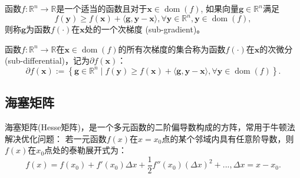 \begin{definition}[次梯度]
    函数$f: \mathbb{R}^{n} \rightarrow \mathbb{R}$是一个适当的函数且对于$\bm{x} \in \operatorname{dom}(f)$, 如果向量$\bm{g} \in \mathbb{R}^{n}$满足
    \begin{equation}
        f(\bm{y}) \geq f(\bm{x})+\langle\bm{g}, \bm{y}-\bm{x}\rangle, \forall \bm{y} \in \mathbb{R}^{n}, \bm{y} \in \operatorname{dom}(f) ,
        \nonumber
    \end{equation}
    则称$\bm{g}$为函数$f(\cdot)$在$\bm{x}$处的一个次梯度 (sub-gradient)。
\end{definition}

\begin{definition}[次微分]
    函数$f: \mathbb{R}^{n} \rightarrow \mathbb{R}$在$\bm{x} \in \operatorname{dom}(f)$的所有次梯度的集合称为函数$f(\cdot)$在$\bm{x}$的次微分 (sub-differential)，记为$\partial f(\bm{x})$：
    \begin{equation}
        \partial f(\bm{x}):=\left\{\bm{g} \in \mathbb{R}^{n} \mid f(\bm{y}) \geq f(\bm{x})+\langle\bm{g}, \bm{y}-\bm{x}\rangle, \forall \bm{y} \in \operatorname{dom}(f)\right\} .
        \nonumber
    \end{equation}
\end{definition}

\subsection{海塞矩阵}
海塞矩阵(Hesse矩阵)，是一个多元函数的二阶偏导数构成的方阵，常用于牛顿法解决优化问题：
若一元函数$f(x)$在$x=x_0$点的某个邻域内具有任意阶导数，则$f(x)$在$x_0$点处的泰勒展开式为：
\begin{equation}
    f(x) = f(x_0) + f'(x_0)\Delta x + \frac{1}{2}f''(x_0)(\Delta x)^2 + ..., \Delta x = x - x_0 .
\end{equation}


